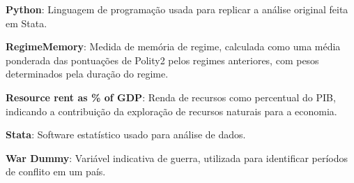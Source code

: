 {\textbf{Python}: Linguagem de programação usada para replicar a análise original feita em Stata.

\textbf{RegimeMemory}: Medida de memória de regime, calculada como uma média ponderada das pontuações de Polity2 pelos regimes anteriores, com pesos determinados pela duração do regime.

\textbf{Resource rent as \% of GDP}: Renda de recursos como percentual do PIB, indicando a contribuição da exploração de recursos naturais para a economia.

\textbf{Stata}: Software estatístico usado para análise de dados.

\textbf{War Dummy}: Variável indicativa de guerra, utilizada para identificar períodos de conflito em um país.

} %


